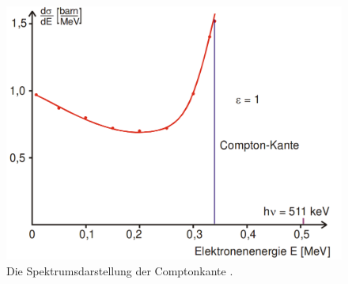 \begin{figure}
	\centering
	\includegraphics[width=\linewidth-100pt,height=\textheight-100pt,keepaspectratio]{content/Images/comptonk.png}
    \caption{Die Spektrumsdarstellung der Comptonkante \cite{V18}.}
    \label{fig:comptonk}
\end{figure}


